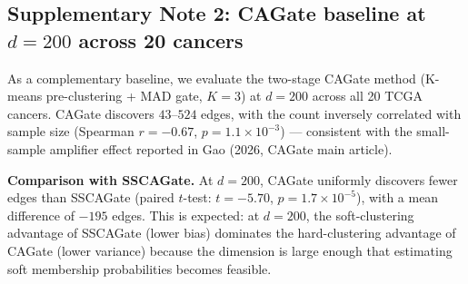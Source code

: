 \documentclass[12pt,a4paper]{article}
\begin{document}
\subsection{Supplementary Note 2: CAGate baseline at $d = 200$ across 20 cancers}
\label{sec:note2}

As a complementary baseline, we evaluate the two-stage CAGate method (K-means
pre-clustering + MAD gate, $K = 3$) at $d = 200$ across all 20 TCGA cancers.
CAGate discovers $43$--$524$ edges, with the count inversely correlated with
sample size (Spearman $r = -0.67$, $p = 1.1 \times 10^{-3}$) --- consistent with
the small-sample amplifier effect reported in Gao (2026, CAGate main article).

\textbf{Comparison with SSCAGate.} At $d = 200$, CAGate uniformly discovers
fewer edges than SSCAGate (paired $t$-test: $t = -5.70$, $p = 1.7 \times 10^{-5}$),
with a mean difference of $-195$ edges. This is expected: at $d = 200$, the
soft-clustering advantage of SSCAGate (lower bias) dominates the hard-clustering
advantage of CAGate (lower variance) because the dimension is large enough that
estimating soft membership probabilities becomes feasible.
\end{document}
